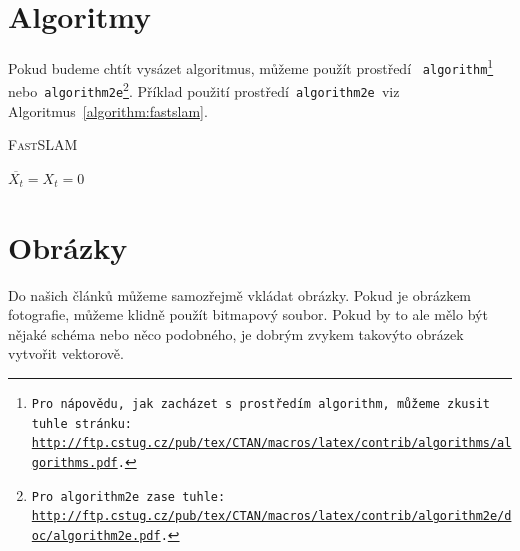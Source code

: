 \documentclass[a4paper, 11pt]{article}
\begin{document}
	\bigskip
	\pagebreak

\section{Algoritmy} \label{section:algoritmy}
    Pokud budeme chtít vysázet algoritmus, můžeme použít prostředí \texttt{ algorithm\footnote{Pro nápovědu, jak zacházet s~prostředím\texttt{ algorithm,} můžeme zkusit tuhle stránku:\\ \href{http://ftp.cstug.cz/pub/tex/CTAN/macros/latex/contrib/algorithms/algorithms.pdf}{http://ftp.cstug.cz/pub/tex/CTAN/macros/latex/contrib/algorithms/algorithms.pdf}.} } nebo\texttt{ algorithm2e\footnote{Pro\texttt{ algorithm2e }zase tuhle: \href{http://ftp.cstug.cz/pub/tex/CTAN/macros/latex/contrib/algorithm2e/doc/algorithm2e.pdf}{http://ftp.cstug.cz/pub/tex/CTAN/macros/latex/contrib/algorithm2e/doc/algorithm2e.pdf}.}}.
    Příklad použití prostředí\texttt{ algorithm2e }viz Algoritmus~\ref{algorithm:fastslam}. \\
    \IncMargin{1.5em}
    \begin{algorithm} 
        \caption{\textsc{FastSLAM}} 
        \label{algorithm:fastslam}
        \SetNlSty{}{}{:}
        \SetNlSkip{0.3em}
        \SetInd{1em}{1em}  
        \Indm
        \Indmm
        \Indp
        \Indpp
        \BlankLine
        $\overline{X_t} = X_t = 0$ \\    
    \end{algorithm}
    \DecMargin{1.5em}
	
\section{Obrázky}
    Do našich článků můžeme samozřejmě vkládat obrázky. Pokud je obrázkem fotografie, můžeme klidně použít bitmapový soubor. Pokud by to ale mělo být nějaké schéma nebo něco podobného, je dobrým zvykem takovýto obrázek vytvořit vektorově.
    
\end{document}
